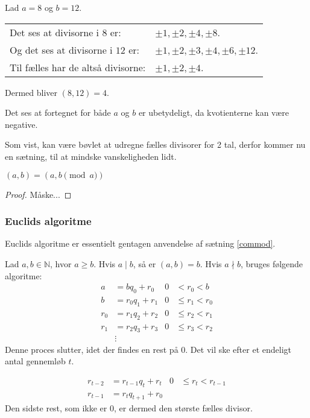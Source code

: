     \begin{eks}
        Lad \(a = 8\) og \(b = 12\).\\
        \begin{tabular*}{\textwidth}{@{} l l}
            Det ses at divisorne i \(8\) er: & \(\pm 1, \pm 2, \pm 4, \pm 8\).\\
            Og det ses at divisorne i \(12\) er:  &\(\pm 1, \pm 2, \pm 3, \pm 4, \pm 6, \pm 12\).\\
            Til fælles har de altså divisorne: & \(\pm 1, \pm 2, \pm 4\).
        \end{tabular*}

        Dermed bliver \((8, 12) = 4\).
    \end{eks}

    Det ses at fortegnet for både \(a\) og \(b\) er ubetydeligt, da kvotienterne kan være negative.

    Som vist, kan være bøvlet at udregne fælles divisorer for 2 tal, derfor kommer nu en sætning, til at mindske vanskeligheden lidt.

    \begin{sent}
        \label{commod}
        \((a, b) = (a, b \pmod{a})\)
    \end{sent}

    \begin{proof}
        Måske...
    \end{proof}


    \subsubsection{Euclids algoritme}
    Euclids algoritme er essentielt gentagen anvendelse af sætning \ref{commod}.
    \begin{definition}
        Lad \(a, b \in \mathbb{N}\), hvor \(a \geq b\).
        Hvis \(a \mid b\), så er \((a, b) = b\).
        Hvis \(a \nmid b\), bruges følgende algoritme:
        \begin{align*}
            a   &= b q_0    + r_0   & 0 &<    r_0 < b\\
            b   &= r_0 q_1  + r_1   & 0 &\leq r_1 < r_0\\
            r_0 &= r_1 q_2  + r_2   & 0 &\leq r_2 < r_1\\
            r_1 &= r_2 q_3  + r_3   & 0 &\leq r_3 < r_2\\
            &\vdots
        \end{align*}
        Denne proces slutter, idet der findes en rest på 0.
        Det vil ske efter et endeligt antal gennemløb \(t\).

        \begin{align*}
            r_{t-2} &= r_{t-1}  q_t      + r_t   & 0 &\leq r_t < r_{t-1}\\
            r_{t-1} &= r_t      q_{t+1}  + r_0
        \end{align*}
        Den sidste rest, som ikke er 0, er dermed den største fælles divisor.\cite[11]{absalg}
    \end{definition}

